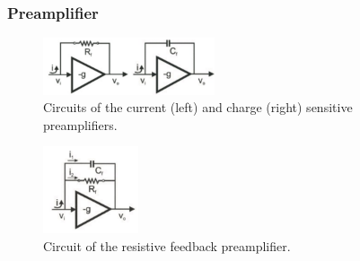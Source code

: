 \subsubsection{Preamplifier}
\begin{figure}[ht]
    \centering
    \includegraphics[width=0.45\textwidth]{images/preamp_circuit_current_charge.png}
    \caption{Circuits of the current (left) and charge (right) sensitive preamplifiers.}
    \label{fig:preamp_circuit_current_charge}
\end{figure}
\begin{figure}[ht]
    \centering
    \includegraphics[width=0.25\textwidth]{images/preamp_circuit_resistive_feedback.png}
    \caption{Circuit of the resistive feedback preamplifier.}
    \label{fig:preamp_circuit_resistive_feedback}
\end{figure}
